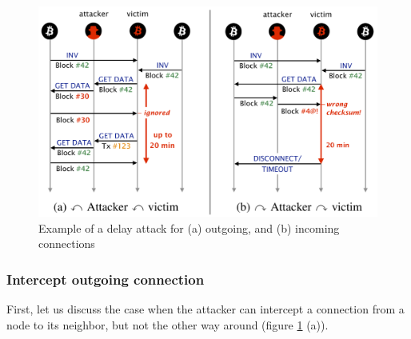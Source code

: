 \documentclass[12pt]{article}
\begin{document}
\begin{figure}
\centering
\includegraphics[width=0.8\columnwidth]{images/delay-attack-detailed.png}
\caption{Example of a delay attack for (a) outgoing, and (b) incoming connections \cite{RoutingAttacks}}
\label{fig:delay-detailed}
\end{figure}

\subsubsection{Intercept outgoing connection}

First, let us discuss the case when the attacker can intercept a connection from a node to its neighbor, but not the other way around (figure \ref{fig:delay-detailed} (a)).
\end{document}
